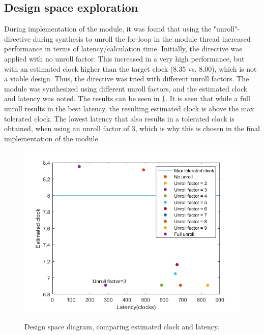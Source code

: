 \subsection{Design space exploration}
\label{sec:design_space_exploration}
During implementation of the module, it was found that using the "unroll"-directive during synthesis to unroll the for-loop in the module thread increased performance in terms of latency/calculation time. Initially, the directive was applied with no unroll factor. This increased in a very high performance, but with an estimated clock higher than the target clock (8.35 vs. 8.00), which is not a viable design. Thus, the directive was tried with different unroll factors. The module was synthesized using different unroll factors, and the estimated clock and latency was noted. The results can be seen in \cref{fig:design_space_diagram}. It is seen that while a full unroll results in the best latency, the resulting estimated clock is above the max tolerated clock. The lowest latency that also results in a tolerated clock is obtained, when using an unroll factor of 3, which is why this is chosen in the final implementation of the module.
\begin{figure}[H]
	\centering
	{\includegraphics[width=\textwidth/2]{Images/paerto_latency_clock.PNG}}\\[0.5cm]
	\caption{Design space diagram, comparing estimated clock and latency.}
	\label{fig:design_space_diagram}
\end{figure}